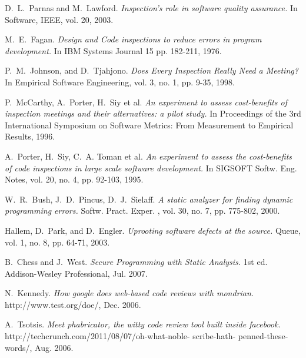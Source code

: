 \documentclass[10pt, conference]{IEEEtran}
\begin{document}
%
%
%
\begin{thebibliography}{1}

D.~L.~Parnas and M.~Lawford. \emph{Inspection’s role in
software quality assurance.} In Software, IEEE, vol.
20, 2003.

M.~E.~Fagan. \emph{Design and Code inspections to reduce
errors in program development.} In IBM Systems
Journal 15 pp. 182-211, 1976.

P.~M.~Johnson, and D.~Tjahjono. \emph{Does Every
Inspection Really Need a Meeting?} In Empirical
Software Engineering, vol. 3, no. 1, pp. 9-35, 1998.

P.~McCarthy, A.~Porter, H.~Siy et al. \emph{An experiment
to assess cost-benefits of inspection meetings and
their alternatives: a pilot study.} In Proceedings of the
3rd International Symposium on Software Metrics:
From Measurement to Empirical Results, 1996.

A.~Porter, H.~Siy, C.~A. Toman et al. \emph{An experiment
to assess the cost-benefits of code inspections in large
scale software development.} In SIGSOFT Softw. Eng.
Notes, vol. 20, no. 4, pp. 92-103, 1995.

W.~R.~Bush, J.~D.~Pincus, D.~J.~Sielaff. \emph{A static
analyzer for finding dynamic programming errors.}
Softw. Pract. Exper. , vol. 30, no. 7, pp. 775-802,
2000.

Hallem, D.~Park, and D.~Engler. \emph{Uprooting software
defects at the source.} Queue, vol. 1, no. 8, pp. 64-71,
2003.

B.~Chess and J.~West. \emph{Secure Programming with
Static Analysis.} 1st ed. Addison-Wesley Professional,
Jul. 2007.

N.~Kennedy. \emph{How google does web-based code reviews
with mondrian.} http://www.test.org/doe/, Dec. 2006.

A.~Tsotsis. \emph{Meet phabricator, the witty code review
tool built inside facebook.}
http://techcrunch.com/2011/08/07/oh-what-noble-
scribe-hath- penned-these-words/, Aug.
2006.


\end{thebibliography}
\end{document}
